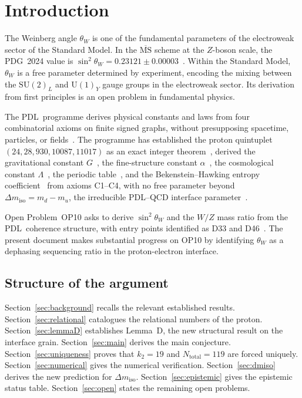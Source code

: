 \documentclass[12pt,a4paper]{article}
\theoremstyle{plain}
\theoremstyle{definition}
\theoremstyle{remark}
\newcommand{\PDL}{\textsc{PDL}}
\newcommand{\thetaW}{\theta_W}
\newcommand{\sinW}{\sin^2\!\thetaW}
\newcommand{\Ntot}{N_{\mathrm{total}}}
\newcommand{\Dmiso}{\Delta m_{\mathrm{iso}}}
\newcommand{\ktwo}{k_2}
\begin{document}
\tableofcontents
\newpage

\section{Introduction}
\label{sec:intro}

The Weinberg angle $\thetaW$ is one of the fundamental parameters of the electroweak sector of the Standard Model. In the $\overline{\mathrm{MS}}$ scheme at the $Z$-boson scale, the PDG~2024 value is $\sinW = 0.23121 \pm 0.00003$~\cite{PDG2024}. Within the Standard Model, $\thetaW$ is a free parameter determined by experiment, encoding the mixing between the $\mathrm{SU}(2)_L$ and $\mathrm{U}(1)_Y$ gauge groups in the electroweak sector. Its derivation from first principles is an open problem in fundamental physics.

The \PDL\ programme derives physical constants and laws from four combinatorial axioms on finite signed graphs, without presupposing spacetime, particles, or fields~\cite{PDL_Main}. The programme has established the proton quintuplet $(24, 28, 930, 10087, 11017)$ as an exact integer theorem~\cite{PDL_D47}, derived the gravitational constant $G$~\cite{PDL_D44}, the fine-structure constant $\alpha$~\cite{PDL_D25}, the cosmological constant $\Lambda$~\cite{PDL_D52}, the periodic table~\cite{PDL_D47}, and the Bekenstein--Hawking entropy coefficient~\cite{PDL_D50} from axioms C1--C4, with no free parameter beyond $\Dmiso = m_d - m_u$, the irreducible \PDL--QCD interface parameter~\cite{PDL_D30}.

Open Problem~OP10 asks to derive $\sinW$ and the $W/Z$ mass ratio from the \PDL\ coherence structure, with entry points identified as D33 and D46~\cite{PDL_DM}. The present document makes substantial progress on OP10 by identifying $\thetaW$ as a dephasing sequencing ratio in the proton-electron interface.

\subsection{Structure of the argument}

Section~\ref{sec:background} recalls the relevant established results. Section~\ref{sec:relational} catalogues the relational numbers of the proton. Section~\ref{sec:lemmaD} establishes Lemma~D, the new structural result on the interface grain. Section~\ref{sec:main} derives the main conjecture. Section~\ref{sec:uniqueness} proves that $\ktwo = 19$ and $\Ntot = 119$ are forced uniquely. Section~\ref{sec:numerical} gives the numerical verification. Section~\ref{sec:dmiso} derives the new prediction for $\Dmiso$. Section~\ref{sec:epistemic} gives the epistemic status table. Section~\ref{sec:open} states the remaining open problems.
\end{document}
